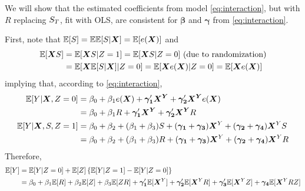 \documentclass{statsoc} %
\begin{document}
We will show that the estimated coefficients from model \eqref{eq:interaction}, but with $R$ replacing $S_T$, fit with OLS, are consistent for $\bm{\beta}$ and $\bm{\gamma}$ from \eqref{eq:interaction}. 

First, note that $\mathbb{E}[S]=\mathbb{E}\mathbb{E}[S|\bm{X}]=\mathbb{E}[e(\bm{X})]$ and
\begin{align*}
  \mathbb{E}[\bm{X} S]&=\mathbb{E}[\bm{X} S|Z=1]=\mathbb{E}[\bm{X} S|Z=0] \mbox{ (due to randomization)}\\
  &=\mathbb{E}[\bm{X}\mathbb{E}[S|\bm{X}]|Z=0]=\mathbb{E}[\bm{X}e(\bm{X})|Z=0]=\mathbb{E}[\bm{X}e(\bm{X})]
\end{align*}
implying that, according to \eqref{eq:interaction},
\begin{equation*}
  \begin{split}
    \mathbb{E}[Y|\bm{X},Z=0]&=\beta_0+\beta_1e(\bm{X})+\bm{\gamma_1}'\bm{X^Y}+\bm{\gamma_2}'\bm{X^Y}e(\bm{X})\\
                  &=\beta_0+\beta_1R+\bm{\gamma_1}'\bm{X^Y}+\bm{\gamma_2}'\bm{X^Y}R\\
    \mathbb{E}[Y|\bm{X},S,Z=1]&=\beta_0+\beta_2+(\beta_1+\beta_3)S+(\bm{\gamma_1}+\bm{\gamma_3})\bm{X}^Y+(\bm{\gamma_2}+\bm{\gamma_4})\bm{X}^Y S\\
    &=\beta_0+\beta_2+(\beta_1+\beta_3)R+(\bm{\gamma_1}+\bm{\gamma_3})\bm{X}^Y+(\bm{\gamma_2}+\bm{\gamma_4})\bm{X}^Y R
  \end{split}
\end{equation*}
Therefore,
\begin{align*}
  \mathbb{E}[Y]&=\mathbb{E}[Y|Z=0]+\mathbb{E}[Z]\left\{\mathbb{E}[Y|Z=1]-\mathbb{E}[Y|Z=0]\right\}\\
  &=\beta_0+\beta_1\mathbb{E}[R]+\beta_2\mathbb{E}[Z]+\beta_3\mathbb{E}[ZR]+\bm{\gamma_1}'\mathbb{E}[\bm{X}^Y]+\bm{\gamma_2}'\mathbb{E}[\bm{X}^Y R]+\bm{\gamma_3}'\mathbb{E}[\bm{X}^Y Z]+\bm{\gamma_4}\mathbb{E}[\bm{X}^Y RZ]
\end{align*}
  
\end{document}
